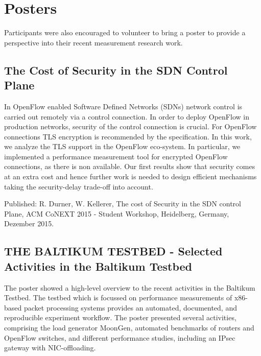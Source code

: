 \section{Posters}\label{sec:posters}

Participants were also encouraged to volunteer to bring a poster to provide a
perspective into their recent measurement research work.

\subsection{The Cost of Security in the SDN Control Plane}

In OpenFlow enabled Software Defined Networks (SDNs) network control is
carried out remotely via a control connection. In order to deploy OpenFlow in
production networks, security of the control connection is crucial. For
OpenFlow connections TLS encryption is recommended by the specification. In
this work, we analyze the TLS support in the OpenFlow eco-system. In
particular, we implemented a performance measurement tool for encrypted
OpenFlow connections, as there is non available.  Our first results show that
security comes at an extra cost and hence further work is needed to design
efficient mechanisms taking the security-delay trade-off into account.

Published: R. Durner, W. Kellerer, The cost of Security in the SDN control
Plane, ACM CoNEXT 2015 - Student Workshop, Heidelberg, Germany, Dezember 2015.


\subsection{THE BALTIKUM TESTBED - Selected Activities in the Baltikum Testbed}

The poster showed a high-level overview to the recent activities in the
Baltikum Testbed. The testbed which is focussed on performance measurements of
x86-based packet processing systems provides an automated, documented, and
reproducible experiment workflow. The poster presented several activities,
comprising the load generator MoonGen, automated benchmarks of routers and
OpenFlow switches, and different performance studies, including an IPsec
gateway with NIC-offloading.

